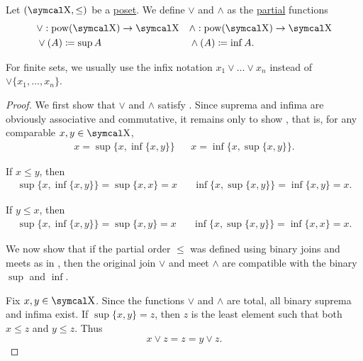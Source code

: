 \begin{definition}\label{def:lattice_operations}
  Let \( (\CX, \leq) \) be a \hyperref[def:poset]{poset}. We define  \( \vee \) and  \( \wedge \) as the \hyperref[def:function/partial]{partial} functions
  \begin{align*}
    &\vee: \Pow(\CX) \to \CX
    &&\wedge: \Pow(\CX) \to \CX
    \\
    &\vee(A) \coloneqq \sup A
    &&\wedge(A) \coloneqq \inf A.
  \end{align*}

  For finite sets, we usually use the infix notation \( x_1 \vee \ldots \vee x_n \) instead of \( \vee \{ x_1, \ldots, x_n \} \).
\end{definition}
\begin{proof}
  We first show that \( \vee \) and \( \wedge \) satisfy . Since suprema and infima are obviously associative and commutative, it remains only to show , that is, for any comparable \( x, y \in \CX \),
  \begin{align*}
    x = \sup \{x, \inf \{ x, y \} \}
    &&
    x = \inf \{x, \sup \{ x, y \} \}.
  \end{align*}

  If \( x \leq y \), then
  \begin{align*}
    \sup \{ x, \inf \{ x, y \} \} = \sup \{ x, x \} = x
    &&
    \inf \{ x, \sup \{ x, y \} \} = \inf \{ x, y \} = x.
  \end{align*}

  If \( y \leq x \), then
  \begin{align*}
    \sup \{ x, \inf \{ x, y \} \} = \sup \{ x, y \} = x
    &&
    \inf \{ x, \sup \{ x, y \} \} = \inf \{ x, x \} = x.
  \end{align*}

  We now show that if the partial order \( \leq \) was defined using binary joins and meets as in , then the original join \( \vee \) and meet \( \wedge \) are compatible with the binary \( \sup \) and \( \inf \).

  Fix \( x, y \in \CX \). Since the functions \( \vee \) and \( \wedge \) are total, all binary suprema and infima exist. If \( \sup \{ x, y \} = z \), then \( z \) is the least element such that both \( x \leq z \) and \( y \leq z \). Thus
  \begin{equation*}
    x \vee z = z = y \vee z.
  \end{equation*}


\end{proof}
